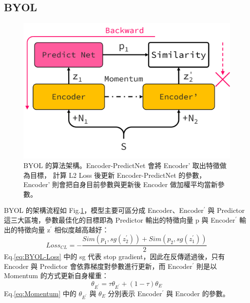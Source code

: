 \documentclass[10pt,twocolumn,letterpaper]{article}
\begin{document}
\begin{CJK}{UTF8}{bkai}
   \subsection{BYOL}
   \begin{figure}
      \begin{center}
         \includegraphics[width=1\linewidth]{img/BYOL.png}
      \end{center}
      \caption{BYOL 的算法架構。Encoder-PredictNet 會將 Encoder' 取出特徵做為目標，
         計算 L2 Loss 後更新 Encoder-PredictNet 的參數，
         Encoder' 則會把自身目前參數與更新後 Encoder 做加權平均當新參數。\label{fig:BYOL}}
   \end{figure}

   BYOL 的架構流程如 Fig.\ref{fig:BYOL}，模型主要可區分成 Encoder、Encoder$^{'}$ 與 Predictor
   這三大區塊，參數最佳化的目標即為 Predictor 輸出的特徵向量 p 與 Encoder$^{'}$ 輸出的特徵向量 z$^{'}$
   相似度越高越好：
   \begin{equation}
      Loss_{CL} = -\frac{Sim(p_1, sg(z^{'}_2))+Sim(p_2, sg(z^{'}_1))}{2}
      \label{eq:BYOL-Loss}
   \end{equation}
   Eq.\ref{eq:BYOL-Loss} 中的 sg 代表 stop gradient，因此在反傳遞過後，只有 Encoder 與 Predictor 會依靠梯度對參數進行更新，而 Encoder$^{'}$ 則是以 Momentum 的方式更新自身權重：
   \begin{equation}
      \theta_{E^{'}}=\tau\theta_{E^{'}}+(1-\tau)\theta_{E}
      \label{eq:Momentum}
   \end{equation}
   Eq.\ref{eq:Momentum} 中的 $\theta_{E^{'}}$ 與 $\theta_{E}$ 分別表示 Encoder$^{'}$ 與 Encoder 的參數。


\end{CJK}
\end{document}
